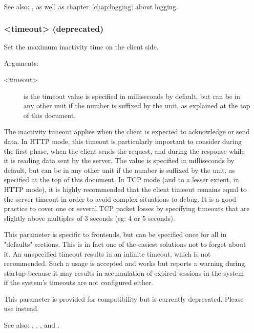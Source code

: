 See also: ,  as well as chapter~\ref{chap:logging}
             about logging.

\subsubsection[clitimeout]{ <timeout> (deprecated)}

  Set the maximum inactivity time on the client side.
  
  
  Arguments:
  \begin{description}
  \item[<timeout>] is the timeout value is specified in milliseconds by default, but
              can be in any other unit if the number is suffixed by the unit,
              as explained at the top of this document.  
  \end{description}

  The inactivity timeout applies when the client is expected to acknowledge or
  send data. In HTTP mode, this timeout is particularly important to consider
  during the first phase, when the client sends the request, and during the
  response while it is reading data sent by the server. The value is specified
  in milliseconds by default, but can be in any other unit if the number is
  suffixed by the unit, as specified at the top of this document. In TCP mode
  (and to a lesser extent, in HTTP mode), it is highly recommended that the
  client timeout remains equal to the server timeout in order to avoid complex
  situations to debug. It is a good practice to cover one or several TCP packet
  losses by specifying timeouts that are slightly above multiples of 3 seconds
  (eg: 4 or 5 seconds).

  This parameter is specific to frontends, but can be specified once for all in
  "defaults" sections. This is in fact one of the easiest solutions not to
  forget about it. An unspecified timeout results in an infinite timeout, which
  is not recommended. Such a usage is accepted and works but reports a warning
  during startup because it may results in accumulation of expired sessions in
  the system if the system's timeouts are not configured either.

  This parameter is provided for compatibility but is currently deprecated.
  Please use  instead.


See also: , , , and
            .

